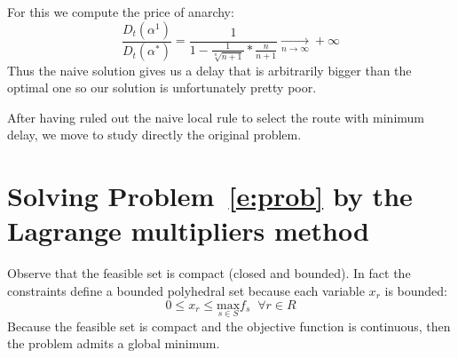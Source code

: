 For this we compute the price of anarchy: $$ \frac{D_t(\alpha ^1)}{D_t(\alpha ^*)} = \frac{1}{1 - \frac{1}{{\sqrt[n]{n+1}}} * \frac{n}{n+1}} \underset{n \to \infty}\rightarrow +\infty$$ Thus the naive solution gives us a delay that is arbitrarily bigger than the optimal one so our solution is unfortunately pretty poor.

After having ruled out the naive local rule to select the route with minimum delay, we move to study directly the original problem.

\section{Solving Problem~\eqref{e:prob} by the Lagrange multipliers method}
Observe that the feasible set is compact (closed and bounded). In fact the constraints define a bounded polyhedral set because each variable $x_r$ is bounded:
\begin{equation}
0 \leq x_r \leq \underset{s \in S}{\text{max}} {f_s} \;\; \forall r \in R
\end{equation}
Because the feasible set is compact and the objective function is continuous, then the problem admits a global minimum. 

